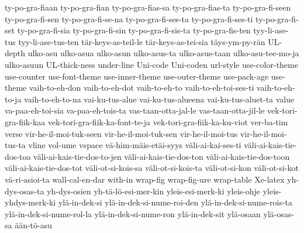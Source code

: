 {ty-po-gra-fiaan
ty-po-gra-fian
ty-po-gra-fias-sa
ty-po-gra-fias-ta
ty-po-gra-fi-seen
ty-po-gra-fi-sen
ty-po-gra-fi-se-na
ty-po-gra-fi-ses-ta
ty-po-gra-fi-ses-ti
ty-po-gra-fi-set
ty-po-gra-fi-sia
ty-po-gra-fi-sin
ty-po-gra-fi-sis-ta
ty-po-gra-fis-ten
tyy-li-ase-tus
tyy-li-ase-tus-ten
tär-keys-as-teil-le
tär-keys-as-tei-sia
täys-ym-py-rän
UL-depth
ulko-asu
ulko-asua
ulko-asun
ulko-asus-ta
ulko-asus-taan
ulko-asu-tee-mo-ja
ulko-asuun
UL-thick-ness
under-line
Uni-code
Uni-coden
url-style
use-color-theme
use-counter
use-font-theme
use-inner-theme
use-outer-theme
use-pack-age
use-theme
vaih-to-eh-don
vaih-to-eh-dot
vaih-to-eh-to
vaih-to-eh-toi-ses-ti
vaih-to-eh-to-ja
vaih-to-eh-to-na
vai-ku-tus-alue
vai-ku-tus-alueena
vai-ku-tus-aluet-ta
value
va-paa-eh-toi-sia
va-paa-eh-tois-ta
vas-taan-otta-jal-le
vas-taan-otta-jil-le
vek-tori-gra-fiik-kaa
vek-tori-gra-fiik-ka-font-te-ja
vek-tori-gra-fiik-ka-ku-viot
ver-ba-tim
verse
vir-he-il-moi-tuk-seen
vir-he-il-moi-tuk-sen
vir-he-il-moi-tus
vir-he-il-moi-tus-ta
vline
vol-ume
vspace
vä-him-mäis-etäi-syys
väli-ai-kai-ses-ti
väli-ai-kais-tie-dos-toa
väli-ai-kais-tie-dos-to-jen
väli-ai-kais-tie-dos-ton
väli-ai-kais-tie-dos-toon
väli-ai-kais-tie-dos-tot
väli-ot-si-kois-sa
väli-ot-si-kois-ta
väli-ot-si-kon
väli-ot-si-kot
vä-ri-asioi-ta
wall-cal-en-dar
with-in
wrap-fig
wrap-fig-ure
wrap-table
Xe-latex
yh-dys-osas-ta
yh-dys-osien
yh-tä-lö-esi-mer-kin
yleis-esi-merk-ki
yleis-ohje
yleis-yhdys-merk-ki
ylä-in-dek-si
ylä-in-dek-si-nume-roi-den
ylä-in-dek-si-nume-rois-ta
ylä-in-dek-si-nume-rol-la
ylä-in-dek-si-nume-ron
ylä-in-dek-sit
ylä-osaan
ylä-osas-sa
ään-tö-asu
}
